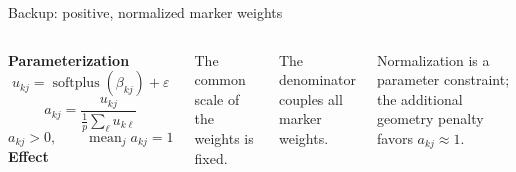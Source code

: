 \begin{frame}{Backup: positive, normalized marker weights}

\begin{columns}[T,onlytextwidth]
\textbf{Parameterization}
\[u_{kj}=\operatorname{softplus}(\beta_{kj})+\varepsilon\]
\[a_{kj}=\frac{u_{kj}}{\frac1p\sum_\ell u_{k\ell}}\]
\[a_{kj}>0,\qquad \operatorname{mean}_j a_{kj}=1\]
\textbf{Effect}\par
The common scale of the weights is fixed.\par
\vspace{3mm}
The denominator couples all marker weights.\par
\vspace{3mm}
Normalization is a parameter constraint; the additional geometry penalty favors $a_{kj}\approx1$.
\end{columns}

\end{frame}
